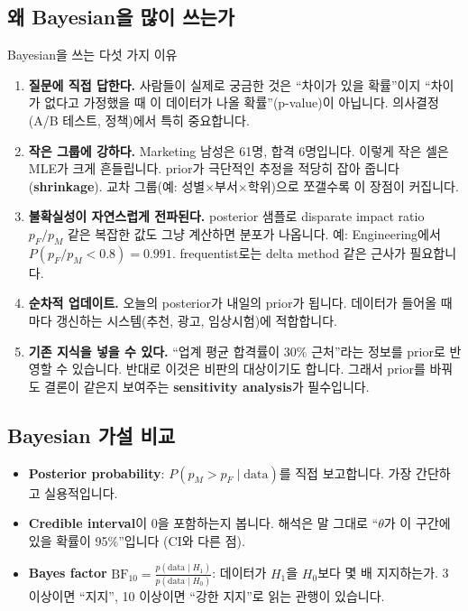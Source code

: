 \documentclass[11pt,a4paper]{article}
\newcommand{\term}[1]{\textbf{#1}}
\begin{document}
\subsection{왜 Bayesian을 많이 쓰는가}
\begin{whybox}{Bayesian을 쓰는 다섯 가지 이유}
\begin{enumerate}
\item \textbf{질문에 직접 답한다.} 사람들이 실제로 궁금한 것은 ``차이가 있을 확률''이지 ``차이가 없다고 가정했을 때 이 데이터가 나올 확률''(p-value)이 아닙니다. 의사결정(A/B 테스트, 정책)에서 특히 중요합니다.
\item \textbf{작은 그룹에 강하다.} Marketing 남성은 61명, 합격 6명입니다. 이렇게 작은 셀은 MLE가 크게 흔들립니다. prior가 극단적인 추정을 적당히 잡아 줍니다 (\term{shrinkage}). 교차 그룹(예: 성별$\times$부서$\times$학위)으로 쪼갤수록 이 장점이 커집니다.
\item \textbf{불확실성이 자연스럽게 전파된다.} posterior 샘플로 disparate impact ratio $p_F/p_M$ 같은 복잡한 값도 그냥 계산하면 분포가 나옵니다. 예: Engineering에서 $P(p_F/p_M<0.8)=0.991$. frequentist로는 delta method 같은 근사가 필요합니다.
\item \textbf{순차적 업데이트.} 오늘의 posterior가 내일의 prior가 됩니다. 데이터가 들어올 때마다 갱신하는 시스템(추천, 광고, 임상시험)에 적합합니다.
\item \textbf{기존 지식을 넣을 수 있다.} ``업계 평균 합격률이 30\% 근처''라는 정보를 prior로 반영할 수 있습니다. 반대로 이것은 비판의 대상이기도 합니다. 그래서 prior를 바꿔도 결론이 같은지 보여주는 \term{sensitivity analysis}가 필수입니다.
\end{enumerate}
\end{whybox}

\subsection{Bayesian 가설 비교}
\begin{itemize}
\item \textbf{Posterior probability}: $P(p_M>p_F\mid\text{data})$를 직접 보고합니다. 가장 간단하고 실용적입니다.
\item \textbf{Credible interval}이 0을 포함하는지 봅니다. 해석은 말 그대로 ``$\theta$가 이 구간에 있을 확률이 95\%''입니다 (CI와 다른 점).
\item \term{Bayes factor} $\mathrm{BF}_{10}=\frac{p(\text{data}\mid H_1)}{p(\text{data}\mid H_0)}$: 데이터가 $H_1$을 $H_0$보다 몇 배 지지하는가. 3 이상이면 ``지지'', 10 이상이면 ``강한 지지''로 읽는 관행이 있습니다.
\end{itemize}
\end{document}
